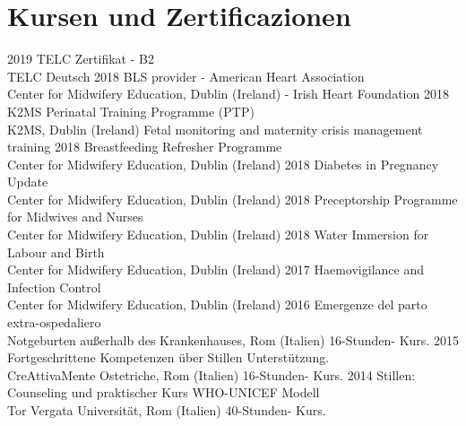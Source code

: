 \documentclass[11pt]{friggeri-cv}
\begin{document}
\section{Kursen und Zertificazionen}
\begin{entrylist}
  \entry
    {2019}
    {TELC Zertifikat - B2}
    {\\TELC Deutsch}
    {\vspace{-10pt}}
  \entry
    {2018}
    {BLS provider - American Heart Association}
    {\\Center for Midwifery Education, Dublin (Ireland) - Irish Heart Foundation}
    {\vspace{-10pt}}
  \entry
    {2018}
    {K2MS Perinatal Training Programme (PTP)}
    {\\K2MS, Dublin (Ireland)}
    {Fetal monitoring and maternity crisis management training}
  \entry
    {2018}
    {Breastfeeding Refresher Programme}
    {\\Center for Midwifery Education, Dublin (Ireland)}
    {\vspace{-10pt}}
  \entry
    {2018}
    {Diabetes in Pregnancy Update}
    {\\Center for Midwifery Education, Dublin (Ireland)}
    {\vspace{-10pt}}
  \entry
    {2018}
    {Preceptorship Programme for Midwives and Nurses}
    {\\Center for Midwifery Education, Dublin (Ireland)}
    {\vspace{-10pt}}
  \entry
    {2018}
    {Water Immersion for Labour and Birth}
    {\\Center for Midwifery Education, Dublin (Ireland)}
    {\vspace{-10pt}}
  \entry
    {2017}
    {Haemovigilance and Infection Control}
    {\\Center for Midwifery Education, Dublin (Ireland)}
    {\vspace{-10pt}}
  \entry
    {2016}
    {Emergenze del parto extra-ospedaliero}
    {\\Notgeburten außerhalb des Krankenhauses, Rom (Italien)}
    {16-Stunden- Kurs.}
  \entry
    {2015}
    {Fortgeschrittene Kompetenzen \"{u}ber Stillen Unterst\"{u}tzung.}
    {\\CreAttivaMente Ostetriche, Rom (Italien)}
    {16-Stunden- Kurs.}
  \entry
    {2014}
    {Stillen: Counseling und praktischer Kurs WHO-UNICEF Modell}
    {\\Tor Vergata Universit\"{a}t, Rom (Italien)}
    {40-Stunden- Kurs.}
\end{entrylist}
\end{document}
